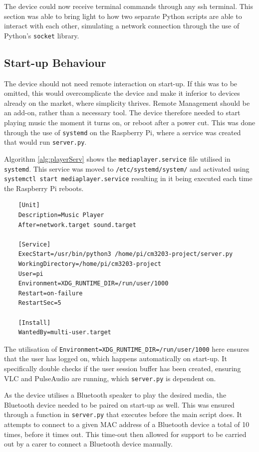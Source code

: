 The device could now receive terminal commands through any \gls{ssh} terminal. This section was able to bring light to how two separate Python scripts are able to interact with each other, simulating a network connection through the use of Python's \texttt{socket} library.
\subsection{Start-up Behaviour}\label{subsec:startup}
The device should not need remote interaction on start-up. If this was to be omitted, this would overcomplicate the device and make it inferior to devices already on the market, where simplicity thrives. Remote Management should be an add-on, rather than a necessary tool. The device therefore needed to start playing music the moment it turns on, or reboot after a power cut. This was done through the use of \texttt{systemd} on the Raspberry Pi, where a service was created that would run \texttt{server.py}.

Algorithm \ref{alg:playerServ} shows the \texttt{mediaplayer.service} file utilised in \texttt{systemd}. This service was moved to \texttt{/etc/systemd/system/} and activated using \texttt{systemctl start mediaplayer.service} resulting in it being executed each time the Raspberry Pi reboots. 
\begin{algorithm}[H]
  \caption{mediaplayer.service}
  \label{alg:playerServ}
  \begin{lstlisting}
    [Unit]
    Description=Music Player
    After=network.target sound.target

    [Service]
    ExecStart=/usr/bin/python3 /home/pi/cm3203-project/server.py
    WorkingDirectory=/home/pi/cm3203-project
    User=pi
    Environment=XDG_RUNTIME_DIR=/run/user/1000
    Restart=on-failure
    RestartSec=5

    [Install]
    WantedBy=multi-user.target
  \end{lstlisting}
\end{algorithm}
The utilisation of \texttt{Environment=XDG\_RUNTIME\_DIR=/run/user/1000} here ensures that the user has logged on, which happens automatically on start-up. It specifically double checks if the user session buffer has been created, ensuring VLC and PulseAudio are running, which \texttt{server.py} is dependent on. 

As the device utilises a Bluetooth speaker to play the desired media, the Bluetooth device needed to be paired on start-up as well. This was ensured through a function in \texttt{server.py} that executes before the main script does. It attempts to connect to a given MAC address of a Bluetooth device a total of 10 times, before it times out. This time-out then allowed for support to be carried out by a carer to connect a Bluetooth device manually. 

